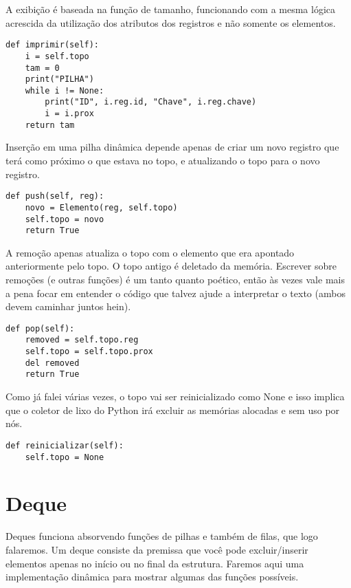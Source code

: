 \documentclass[a4paper, twocolumn]{article}
\theoremstyle{definition}
\begin{document}
A exibição é baseada na função de tamanho, funcionando com a mesma lógica acrescida da utilização dos atributos dos registros e não somente os elementos.
\begin{lstlisting}[label=pilha_din_imprimir, caption= Pilha dinâmica (exibição)]
def imprimir(self):
    i = self.topo
    tam = 0
    print("PILHA")
    while i != None:
        print("ID", i.reg.id, "Chave", i.reg.chave)
        i = i.prox
    return tam
\end{lstlisting}

Inserção em uma pilha dinâmica depende apenas de criar um novo registro que terá como próximo o que estava no topo, e atualizando o topo para o novo registro.
\begin{lstlisting}[label=pilha_din_push, caption= Pilha dinâmica (inserção)]
def push(self, reg):
    novo = Elemento(reg, self.topo)
    self.topo = novo
    return True
\end{lstlisting}

A remoção apenas atualiza o topo com o elemento que era apontado anteriormente pelo topo. O topo antigo é deletado da memória. Escrever sobre remoções (e outras funções) é um tanto quanto poético, então às vezes vale mais a pena focar em entender o código que talvez ajude a interpretar o texto (ambos devem caminhar juntos hein).
\begin{lstlisting}[label=pilha_din_pop, caption= Pilha dinâmica (remoção)]
def pop(self):
    removed = self.topo.reg
    self.topo = self.topo.prox
    del removed
    return True
\end{lstlisting}

Como já falei várias vezes, o topo vai ser reinicializado como None e isso implica que o coletor de lixo do Python irá excluir as memórias alocadas e sem uso por nós.
\begin{lstlisting}[label=pilha_din_reiniciar, caption= Pilha dinâmica (reinicialização)]
def reinicializar(self):
    self.topo = None
\end{lstlisting}

\section{Deque}
Deques funciona absorvendo funções de pilhas e também de filas, que logo falaremos. Um deque consiste da premissa que você pode excluir/inserir elementos apenas no início ou no final da estrutura. Faremos aqui uma implementação dinâmica para mostrar algumas das funções possíveis.
\end{document}
